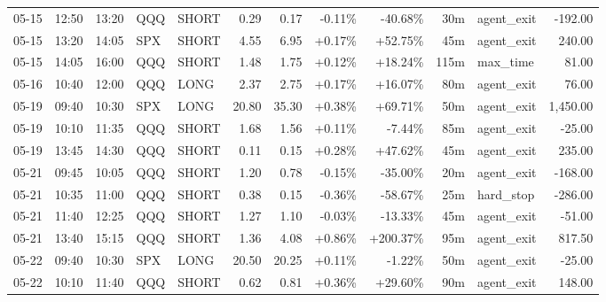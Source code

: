 \documentclass[11pt,a4paper,twoside]{article}
\begin{document}
\begin{center}
\begin{longtable}{>{\color{txtmain}}l l l l l r r r r r >{\color{txtmain}}l r}
05-15 & 12:50 & 13:20 & QQQ & SHORT & 0.29 & 0.17 & \textcolor{lossred}{-0.11\%} & \textcolor{lossred}{-40.68\%} & 30m & agent\_exit & \textcolor{lossred}{-192.00} \\
05-15 & 13:20 & 14:05 & SPX & SHORT & 4.55 & 6.95 & \textcolor{wingreen}{+0.17\%} & \textcolor{wingreen}{+52.75\%} & 45m & agent\_exit & \textcolor{wingreen}{240.00} \\
05-15 & 14:05 & 16:00 & QQQ & SHORT & 1.48 & 1.75 & \textcolor{wingreen}{+0.12\%} & \textcolor{wingreen}{+18.24\%} & 115m & max\_time & \textcolor{wingreen}{81.00} \\
05-16 & 10:40 & 12:00 & QQQ & LONG & 2.37 & 2.75 & \textcolor{wingreen}{+0.17\%} & \textcolor{wingreen}{+16.07\%} & 80m & agent\_exit & \textcolor{wingreen}{76.00} \\
05-19 & 09:40 & 10:30 & SPX & LONG & 20.80 & 35.30 & \textcolor{wingreen}{+0.38\%} & \textcolor{wingreen}{+69.71\%} & 50m & agent\_exit & \textcolor{wingreen}{1,450.00} \\
05-19 & 10:10 & 11:35 & QQQ & SHORT & 1.68 & 1.56 & \textcolor{wingreen}{+0.11\%} & \textcolor{lossred}{-7.44\%} & 85m & agent\_exit & \textcolor{lossred}{-25.00} \\
05-19 & 13:45 & 14:30 & QQQ & SHORT & 0.11 & 0.15 & \textcolor{wingreen}{+0.28\%} & \textcolor{wingreen}{+47.62\%} & 45m & agent\_exit & \textcolor{wingreen}{235.00} \\
05-21 & 09:45 & 10:05 & QQQ & SHORT & 1.20 & 0.78 & \textcolor{lossred}{-0.15\%} & \textcolor{lossred}{-35.00\%} & 20m & agent\_exit & \textcolor{lossred}{-168.00} \\
05-21 & 10:35 & 11:00 & QQQ & SHORT & 0.38 & 0.15 & \textcolor{lossred}{-0.36\%} & \textcolor{lossred}{-58.67\%} & 25m & hard\_stop & \textcolor{lossred}{-286.00} \\
05-21 & 11:40 & 12:25 & QQQ & SHORT & 1.27 & 1.10 & \textcolor{lossred}{-0.03\%} & \textcolor{lossred}{-13.33\%} & 45m & agent\_exit & \textcolor{lossred}{-51.00} \\
05-21 & 13:40 & 15:15 & QQQ & SHORT & 1.36 & 4.08 & \textcolor{wingreen}{+0.86\%} & \textcolor{wingreen}{+200.37\%} & 95m & agent\_exit & \textcolor{wingreen}{817.50} \\
05-22 & 09:40 & 10:30 & SPX & LONG & 20.50 & 20.25 & \textcolor{wingreen}{+0.11\%} & \textcolor{lossred}{-1.22\%} & 50m & agent\_exit & \textcolor{lossred}{-25.00} \\
05-22 & 10:10 & 11:40 & QQQ & SHORT & 0.62 & 0.81 & \textcolor{wingreen}{+0.36\%} & \textcolor{wingreen}{+29.60\%} & 90m & agent\_exit & \textcolor{wingreen}{148.00} \\

\end{longtable}
\end{center}
\end{document}
